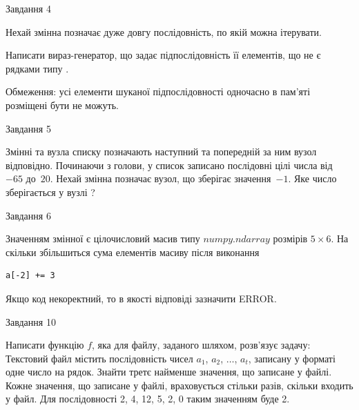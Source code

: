 \documentclass[12pt, ukrainian]{article}
\begin{document}
{\begin{minipage}[t]{8.0cm}
\end{minipage}


               
{\begin{center}Завдання {4}\end{center}}
\vspace{-4mm}
Нехай змінна  позначає дуже довгу послідовність, по якій можна ітерувати.

Написати вираз-генератор, що задає підпослідовність її елементів, що не є рядками типу .

Обмеження: усі елементи шуканої підпослідовності одночасно в пам'яті розміщені бути не можуть.\par

\vspace{10mm}
               
{\begin{center}Завдання {5}\end{center}}
\vspace{-4mm}
Змінні  та  вузла списку позначають наступний та попередній за ним вузол відповідно. Починаючи з голови, у список записано послідовні цілі числа від~$-65$ до~$20$. Нехай змінна  позначає вузол, що зберігає значення~$-1$.
Яке число зберігається у вузлі  ?\par

               
{\begin{center}Завдання {6}\end{center}}
\vspace{-4mm}
Значенням змінної  є цілочисловий масив типу $numpy.ndarray$ розмірів $5{\times}6$. На скільки збільшиться сума елементів масиву  після виконання
\begin{verbatim}
a[-2] += 3
\end{verbatim}


Якщо код некоректний, то в якості відповіді зазначити ERROR.\par

               
{\begin{center}Завдання {10}\end{center}}
\vspace{-4mm}

Написати функцію $f$, яка для файлу, заданого шляхом, розв’язує задачу:\\ Текстовий файл містить послідовність чисел $a_1$, $a_2$, $\ldots$, $a_t$, записану у форматі одне число на рядок. Знайти третє найменше значення, що записане у файлі. Кожне значення, що записане у файлі, враховується стільки разів, скільки входить у файл. Для послідовності 2, 4, 12, 5, 2, 0 таким значенням буде 2.

}
\end{document}
